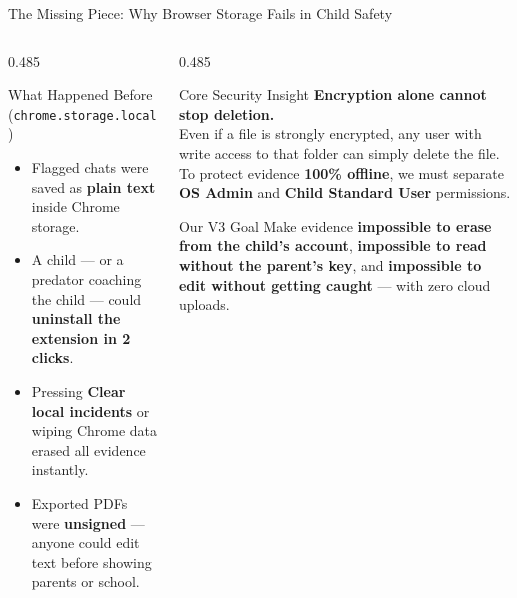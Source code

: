 \documentclass[aspectratio=169,10pt]{beamer}
\begin{document}
\begin{frame}{The Missing Piece: Why Browser Storage Fails in Child Safety}
  \begin{columns}[T]
    \begin{column}{0.485\textwidth}
      \begin{softcard}[snRed!60]{What Happened Before (\texttt{chrome.storage.local})}
        \footnotesize
        \begin{itemize}
          \setlength\itemsep{6pt}
          \item Flagged chats were saved as \textbf{plain text} inside Chrome storage.
          \item A child --- or a predator coaching the child --- could \textbf{uninstall the extension in 2 clicks}.
          \item Pressing \textbf{Clear local incidents} or wiping Chrome data erased all evidence instantly.
          \item Exported PDFs were \textbf{unsigned} --- anyone could edit text before showing parents or school.
        \end{itemize}
      \end{softcard}
    \end{column}
    \begin{column}{0.485\textwidth}
      \begin{accentcard}[snAccent]{Core Security Insight}
        \footnotesize
        \textbf{Encryption alone cannot stop deletion.}\\[5pt]
        Even if a file is strongly encrypted, any user with write access to that folder can simply delete the file.\\[5pt]
        To protect evidence \textbf{100\% offline}, we must separate \textbf{OS Admin} and \textbf{Child Standard User} permissions.
      \end{accentcard}

      \vspace{0.2cm}
      \begin{softcard}[snGreen!55]{Our V3 Goal}
        \scriptsize
        Make evidence \textbf{impossible to erase from the child's account}, \textbf{impossible to read without the parent's key}, and \textbf{impossible to edit without getting caught} --- with zero cloud uploads.
      \end{softcard}
    \end{column}
  \end{columns}
\end{frame}
\end{document}
